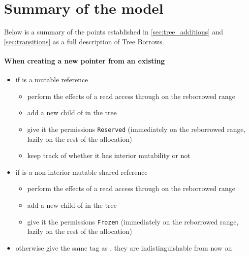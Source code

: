 \documentclass[a4paper,11pt]{article}
\theoremstyle{plain}
\theoremstyle{definition}
\theoremstyle{remark}
\newcommand{\tcode}[1]{\rstinline{#1}}
\newcommand{\tperm}[1]{\texttt{#1}}
\begin{document}
\newpage
\section{Summary of the model}

Below is a summary of the points established in \ref{sec:tree_additions} and \ref{sec:transitions}
as a full description of Tree Borrows.

\paragraph*{When creating a new pointer \tcode{z} from an existing \tcode{y}}
\begin{itemize}
    \item if \tcode{z} is a \tcode{Unpin} mutable reference
        \begin{itemize}
            \item perform the effects of a read access through \tcode{y} on the reborrowed range
            \item add a new child of \tcode{y} in the tree
            \item give it the permissions \tperm{Reserved}
                (immediately on the reborrowed range, lazily on the rest of the allocation)
            \item keep track of whether it has interior mutability or not
        \end{itemize}
    \item if \tcode{z} is a non-interior-mutable shared reference
        \begin{itemize}
            \item perform the effects of a read access through \tcode{y} on the reborrowed range
            \item add a new child of \tcode{y} in the tree
            \item give it the permissions \tperm{Frozen}
                (immediately on the reborrowed range, lazily on the rest of the allocation)
        \end{itemize}
    \item otherwise give \tcode{z} the same tag as \tcode{y}, they are indistinguishable from now on
\end{itemize}
\end{document}
